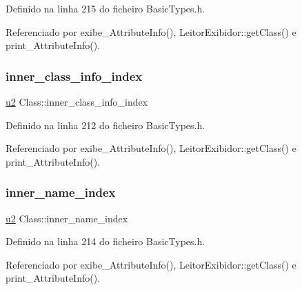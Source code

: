 Definido na linha 215 do ficheiro Basic\+Types.\+h.



Referenciado por exibe\+\_\+\+Attribute\+Info(), Leitor\+Exibidor\+::get\+Class() e print\+\_\+\+Attribute\+Info().

\mbox{\label{structClass_a77e310982b1471782be2caf432cb9af0}} 
\subsubsection{\texorpdfstring{inner\+\_\+class\+\_\+info\+\_\+index}{inner\_class\_info\_index}}
{\footnotesize\ttfamily \hyperlink{BasicTypes_8h_a732cde1300aafb73b0ea6c2558a7a54f}{u2} Class\+::inner\+\_\+class\+\_\+info\+\_\+index}



Definido na linha 212 do ficheiro Basic\+Types.\+h.



Referenciado por exibe\+\_\+\+Attribute\+Info(), Leitor\+Exibidor\+::get\+Class() e print\+\_\+\+Attribute\+Info().

\mbox{\label{structClass_a21dcd0b51d443a4cbaa870d658281105}} 
\subsubsection{\texorpdfstring{inner\+\_\+name\+\_\+index}{inner\_name\_index}}
{\footnotesize\ttfamily \hyperlink{BasicTypes_8h_a732cde1300aafb73b0ea6c2558a7a54f}{u2} Class\+::inner\+\_\+name\+\_\+index}



Definido na linha 214 do ficheiro Basic\+Types.\+h.



Referenciado por exibe\+\_\+\+Attribute\+Info(), Leitor\+Exibidor\+::get\+Class() e print\+\_\+\+Attribute\+Info().

\mbox{\label{structClass_a57bc4e6c8f985b9ee267d190e612dca8}} 
